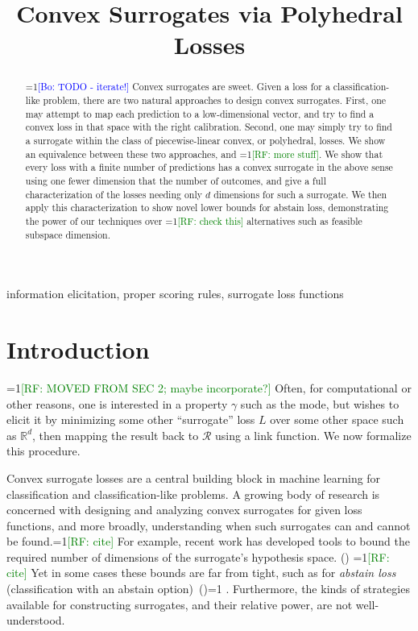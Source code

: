 \documentclass[anon,12pt]{colt2019}
\title{Convex Surrogates via Polyhedral Losses}
\newcommand{\Comments}{1}
\newcommand{\mynote}[2]{\ifnum\Comments=1\textcolor{#1}{#2}\fi}
\newcommand{\mytodo}[2]{\ifnum\Comments=1%
  \todo[linecolor=#1!80!black,backgroundcolor=#1,bordercolor=#1!80!black]{#2}\fi}
\newcommand{\raf}[1]{\mynote{green}{[RF: #1]}}
\newcommand{\raft}[1]{\mytodo{green!20!white}{RF: #1}}
\newcommand{\bo}[1]{\mynote{blue}{[Bo: #1]}}
\newcommand{\reals}{\mathbb{R}}
\newcommand{\R}{\mathcal{R}}
\begin{document}
\maketitle

\begin{abstract}
  \bo{TODO - iterate!}
  Convex surrogates are sweet.
  Given a loss for a classification-like problem, there are two natural approaches to design convex surrogates.
  First, one may attempt to map each prediction to a low-dimensional vector, and try to find a convex loss in that space with the right calibration.
  Second, one may simply try to find a surrogate within the class of piecewise-linear convex, or polyhedral, losses.
  We show an equivalence between these two approaches, and \raf{more stuff}.
  We show that every loss with a finite number of predictions has a convex surrogate in the above sense using one fewer dimension that the number of outcomes, and give a full characterization of the losses needing only $d$ dimensions for such a surrogate.
  We then apply this characterization to show novel lower bounds for abstain loss, demonstrating the power of our techniques over \raf{check this} alternatives such as feasible subspace dimension.
\end{abstract}
\begin{keywords}%
  information elicitation, proper scoring rules, surrogate loss functions
\end{keywords}

\section{Introduction}\label{sec:intro}

\raf{MOVED FROM SEC 2; maybe incorporate?}
Often, for computational or other reasons, one is interested in a property $\gamma$ such as the mode, but wishes to elicit it by minimizing some other ``surrogate'' loss $L$ over some other space such as $\reals^d$, then mapping the result back to $\R$ using a link function.
We now formalize this procedure.


Convex surrogate losses are a central building block in machine learning for classification and classification-like problems.
A growing body of research is concerned with designing and analyzing convex surrogates for given loss functions, and more broadly, understanding when such surrogates can and cannot be found.\raf{cite}
For example, recent work has developed tools to bound the required number of dimensions of the surrogate's hypothesis space. (\cite{frongillo2015elicitation,  ramaswamy2016convex}) \raf{cite}
Yet in some cases these bounds are far from tight, such as for \emph{abstain loss} (classification with an abstain option)~(\cite{bartlett2008classification, yuan2010classification, ramaswamy2016convex, ramaswamy2018consistent})\raft{cite}.
Furthermore, the kinds of strategies available for constructing surrogates, and their relative power, are not well-understood.
\end{document}
